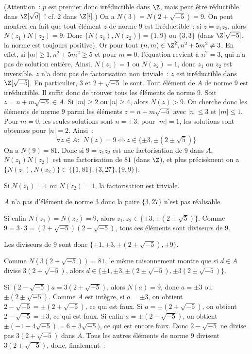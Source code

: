 {\begin{enumerate}
{(Attention~: $p$ est premier donc irréductible dans $\Z$, mais peut être
réductible dans $\Z[\sqrt{d}]$~! cf. $2$ dans $\Z[i]$.)
On a $N(3)=N(2+\sqrt{-5})=9$. On peut montrer en fait que tout élément
$z$ de norme $9$ est irréductible~: si $z=z_{1}z_{2}$, alors
$N(z_{1})N(z_{2})=9$. Donc $\{N(z_{1}),N(z_{2})\}=\{1,9\}$ ou $\{3,3\}$
(dans $\Z[\sqrt{-5}]$, la norme est toujours positive). Or pour tout
$(n,m)\in\Z^{2}, n^{2}+5m^{2}\neq 3$. En effet, si $|m|\geq 1,
n^{2}+5m^{2}\geq 5$ et pour $m=0$, l'équation revient à $n^{2}=3$, qui
n'a pas de solution entière. Ainsi, $N(z_{1})=1$ ou $N(z_{2})=1$, donc
$z_{1}$ ou $z_{2}$ est inversible. $z$ n'a donc pas de factorisation non
triviale~: $z$ est irréductible dans $\Z[\sqrt{-5}]$. En particulier, $3$
et $2+\sqrt{-5}$ le sont.
Tout élément de $A$ de norme $9$ est irréductible. Il suffit donc de
trouver tous les éléments de norme $9$. Soit $z=n+m\sqrt{-5}\in A$. Si
$|m|\geq 2$ ou $|n|\geq 4$, alors $N(z)>9$. On cherche donc les éléments
de norme $9$ parmi les éléments $z=n+m\sqrt{-5}$ avec $|n|\leq3$ et
$|m|\leq 1$. Pour $m=0$, les seules solutions sont $n=\pm 3$, pour
$|m|=1$, les solutions sont obtenues pour $|n|=2$. Ainsi~:
$$
\forall z\in A:\ \ N(z)=9\Leftrightarrow z\in\{\pm3,\pm(2\pm\sqrt{5})\}
$$
On a $N(9)=81$. Donc si $9=z_{1}z_{2}$ est une factorisation de $9$ dans
$A$, $N(z_{1})N(z_{2})$ est une factorisation de $81$ (dans $\Z$), et
plus précisément on a
$\{N(z_{1}),N(z_{2})\}\in\Big\{\{1,81\},\{3,27\},\{9,9\}\Big\}$.

Si $N(z_{1})=1$ ou $N(z_{2})=1$, la factorisation est triviale.

$A$ n'a pas d'élément de norme $3$ donc la paire $\{3,27\}$ n'est pas
réalisable.

Si enfin $N(z_{1})=N(z_{2})=9$, alors
$z_{1},z_{2}\in\{\pm3,\pm(2\pm\sqrt{5})\}$. Comme
$9=3\cdot3=(2+\sqrt{-5})(2-\sqrt{-5})$, tous ces éléments sont diviseurs
de $9$.

Les diviseurs de $9$ sont donc $\{\pm1,\pm3,\pm(2\pm\sqrt{-5}),\pm9\}$. 

\medskip

Comme $N(3(2+\sqrt{-5}))=81$, le même raisonnement montre que si $d\in A$
divise $3(2+\sqrt{-5})$, alors
$d\in\{\pm1,\pm3,\pm(2\pm\sqrt{-5}),\pm3(2\pm\sqrt{-5})\}$.

Si $(2-\sqrt{-5})a=3(2+\sqrt{-5})$, alors $N(a)=9$, donc $a=\pm3$ ou
$\pm(2\pm\sqrt{-5})$. Comme $A$ est intègre, si $a=\pm3$, on obtient
$2-\sqrt{-5}=\pm(2+\sqrt{-5})$, ce qui est faux. Si $a=\pm(2+\sqrt{-5})$,
on obtient $2-\sqrt{-5}=\pm3$, ce qui est faux. Si enfin
$a=\pm(2-\sqrt{-5})$, on obtient $\pm(-1-4\sqrt{-5})=6+3\sqrt{-5})$, ce
qui est encore faux. Donc $2-\sqrt{-5}$ ne divise pas $3(2+\sqrt{-5})$
dans $A$. Tous les autres éléments de norme $9$ divisent
$3(2+\sqrt{-5})$, donc, finalement~:

}
\end{enumerate}}
